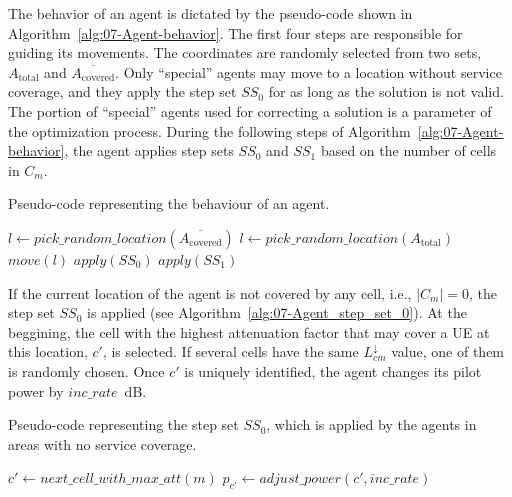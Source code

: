 The behavior of an agent is dictated by the pseudo-code shown in Algorithm~\ref{alg:07-Agent-behavior}.
The first four steps are responsible for guiding its movements. The
coordinates are randomly selected from two sets, $A_{\mathrm{total}}$
and $\overline{A_{\mathrm{covered}}}$. Only ``special'' agents
may move to a location without service coverage, and they apply the
step set $SS_{0}$ for as long as the solution is not valid. The portion
of ``special'' agents used for correcting a solution is a parameter
of the optimization process. During the following steps of Algorithm~\ref{alg:07-Agent-behavior},
the agent applies step sets $SS_{0}$ and $SS_{1}$ based on the number
of cells in $C_{m}$.

\begin{algorithm}
\centering

\caption{Pseudo-code representing the behaviour of an agent.\textit{\label{alg:07-Agent-behavior}}}


\begin{algorithmic}
\Repeat
		\State $l \gets pick\_random\_location(\overline{A_{\mathrm{covered}}})$
	\Else
		\State $l \gets pick\_random\_location(A_{\mathrm{total}})$
	\EndIf
	\State $move(l)$
		\State $apply(SS_{0})$
	\Else
			\State $apply(SS_{1})$
		\EndIf
	\EndIf
{}
\end{algorithmic}
\end{algorithm}


If the current location of the agent is not covered by any cell, i.e.,
$\vert C_{m}\vert=0$, the step set $SS_{0}$ is applied (see Algorithm~\ref{alg:07-Agent_step_set_0}).
At the beggining, the cell with the highest attenuation factor that
may cover a UE at this location, $c'$, is selected. If several cells
have the same $L_{cm}^{\downarrow}$ value, one of them is randomly
chosen. Once $c'$ is uniquely identified, the agent changes its pilot
power by $inc\_rate$~dB.

\begin{algorithm}
\centering

\caption{Pseudo-code representing the step set $SS_{0}$, which is applied
by the agents in areas with no service coverage.\textit{\label{alg:07-Agent_step_set_0}}}


\begin{algorithmic}
\Repeat
	\State $c'\gets next\_cell\_with\_max\_att(m)$
	\State $p_{c'}\gets adjust\_power(c',inc\_rate)$
\end{algorithmic}
\end{algorithm}


